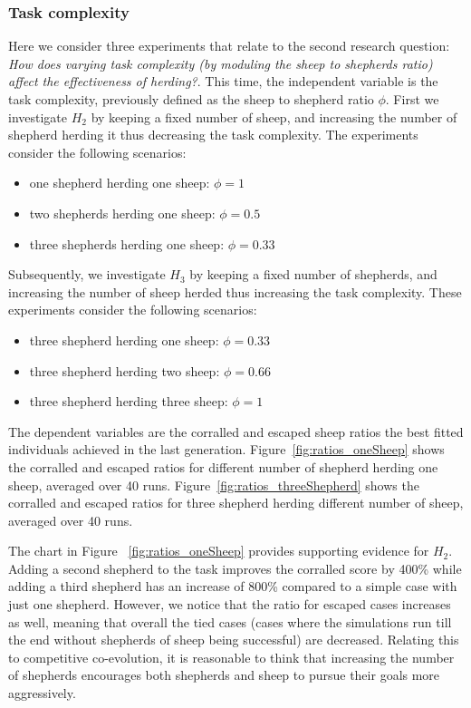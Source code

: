 \documentclass[conference]{IEEEtran}
\begin{document}
\vspace{0.5em}
\subsubsection{Task complexity}
Here we consider three experiments that relate to the second research question: \textit{How does varying task complexity (by moduling the sheep to shepherds ratio) affect the effectiveness of herding?}. 
This time, the independent variable is the task complexity, previously defined as the sheep to shepherd ratio $\phi$.
First we investigate $H_2$ by keeping a fixed number of sheep, and increasing the number of shepherd herding it thus decreasing the task complexity. 
The experiments consider the following scenarios:
\begin{itemize}
	\item one shepherd herding one sheep: $\phi = 1$
	\item two shepherds herding one sheep: $\phi = 0.5$
	\item three shepherds herding one sheep: $\phi = 0.33$
\end{itemize}	

Subsequently, we investigate $H_3$ by keeping a fixed number of shepherds, and increasing the number of sheep herded thus increasing the task complexity. These experiments consider the following scenarios:
\begin{itemize}
	\item three shepherd herding one sheep: $\phi = 0.33$
	\item three shepherd herding two sheep: $\phi = 0.66$
	\item three shepherd herding three sheep: $\phi = 1$
\end{itemize}
The dependent variables are the corralled and escaped sheep ratios the best fitted individuals achieved in the last generation.
Figure~\ref{fig:ratios_oneSheep} shows the corralled and escaped ratios for different number of shepherd herding one sheep, averaged over 40 runs. 
Figure~\ref{fig:ratios_threeShepherd} shows the corralled and escaped ratios for three shepherd herding different number of sheep, averaged over 40 runs. 

The chart in Figure ~\ref{fig:ratios_oneSheep} provides supporting evidence for $H_2$. Adding a second shepherd to the task improves the corralled score by 400\% while adding a third shepherd has an increase of 800\% compared to a simple case with just one shepherd. 
However, we notice that the ratio for escaped cases increases as well, meaning that overall the tied cases (cases where the simulations run till the end without shepherds of sheep being successful) are decreased. 
Relating this to competitive co-evolution, it is reasonable to think that increasing the number of shepherds encourages both shepherds and sheep to pursue their goals more aggressively. %
\end{document}
